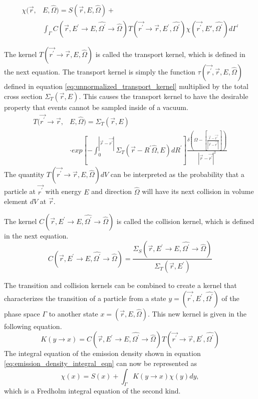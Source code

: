\begin{equation}
  \begin{split}
    \chi(\vec{r},&E,\hat{\Omega}) = S(\vec{r},E,\hat{\Omega}) + \\
    &\int_{\Gamma}C(\vec{r},E^{'} \to E,\hat{\Omega^{'}} \to \hat{\Omega})
    T(\vec{r^{'}} \to \vec{r},E^{'},\hat{\Omega^{'}}) 
    \chi(\vec{r^{'}},E',\hat{\Omega^{'}}) d\Gamma^{'}
  \end{split}
  \label{eq:emission_density_integral_eqn}
\end{equation}

The kernel $T(\vec{r^{'}} \to \vec{r},E,\hat{\Omega})$ is called the transport
kernel, which is defined in the next equation. The transport kernel is simply
the function $\tau(\vec{r^{'}},\vec{r},E,\hat{\Omega})$ defined in equation 
\ref{eq:unnormalized_transport_kernel} multiplied by the total cross section
$\Sigma_T(\vec{r},E)$. This causes the transport kernel to have the desirable
property that events cannot be sampled inside of a vacuum.
\begin{equation}
  \begin{split}
    T(\vec{r^{'}} \to \vec{r},&E,\hat{\Omega}) = \Sigma_T(\vec{r},E) \\
    &\cdot exp\left[-\int_0^{|\vec{r} - \vec{r^{'}}|} 
      \Sigma_T(\vec{r}-R^{'}\hat{\Omega},E)dR^{'} \right] 
    \frac{\delta \left(\Omega - \left[\frac{\vec{r} - \vec{r^{'}}}
        {|\vec{r} - \vec{r^{'}}|}\right]\right)}
    {|\vec{r} - \vec{r^{'}}|^2} 
  \end{split}
\end{equation}
The quantity $T(\vec{r^{'}} \to \vec{r},E,\hat{\Omega})dV$ can be interpreted
as the probability that a particle at $\vec{r^{'}}$ with energy $E$ and 
direction $\hat{\Omega}$ will have its next collision in volume element $dV$
at $\vec{r}$.  

The kernel $C(\vec{r},E^{'} \to E,\hat{\Omega^{'}} \to \hat{\Omega})$ is called
the collision kernel, which is defined in the next equation.
\begin{equation}
  C(\vec{r},E^{'} \to E,\hat{\Omega^{'}} \to \hat{\Omega}) = 
  \frac{\Sigma_S(\vec{r},E^{'} \to E,\hat{\Omega^{'}} \to \hat{\Omega})}
       {\Sigma_T(\vec{r},E^{'})}
\end{equation}

The transition and collision kernels can be combined to create a kernel that
characterizes the transition of a particle from a state 
$y = (\vec{r^{'}},E^{'},\hat{\Omega^{'}})$ of the phase space $\Gamma$ to another 
state $x = (\vec{r},E,\hat{\Omega})$. This new kernel is given in the following 
equation.
\begin{equation}
  K(y \to x) =
  C(\vec{r},E^{'} \to E,\hat{\Omega^{'}} \to \hat{\Omega})
    T(\vec{r^{'}} \to \vec{r},E^{'},\hat{\Omega^{'}})
\end{equation}
The integral equation of the emission density shown in equation 
\ref{eq:emission_density_integral_eqn} can now be represented as
\begin{equation*}
  \chi(x) = S(x) + \int_{\Gamma} K(y \to x)\chi(y)dy,
\end{equation*}
which is a Fredholm integral equation of the second kind. 

